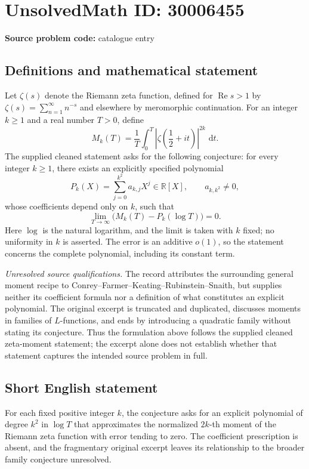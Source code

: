 \documentclass[11pt]{article}
\newcommand{\R}{\mathbb{R}}
\newcommand{\dd}{\,\mathrm{d}}
\begin{document}
\section*{UnsolvedMath ID: 30006455}
\textbf{Source problem code:} catalogue entry
\subsection{Definitions and mathematical statement}
Let \(\zeta(s)\) denote the Riemann zeta function, defined for \(\operatorname{Re}s>1\) by \(\zeta(s)=\sum_{n=1}^{\infty}n^{-s}\) and elsewhere by meromorphic continuation. For an integer \(k\geq1\) and a real number \(T>0\), define
\[
M_k(T)=\frac{1}{T}\int_0^T\left|\zeta\!\left(\frac12+it\right)\right|^{2k}\,\dd t.
\]
The supplied cleaned statement asks for the following conjecture: for every integer \(k\geq1\), there exists an explicitly specified polynomial
\[
P_k(X)=\sum_{j=0}^{k^2}a_{k,j}X^j\in\R[X],\qquad a_{k,k^2}\ne0,
\]
whose coefficients depend only on \(k\), such that
\[
\lim_{T\to\infty}\bigl(M_k(T)-P_k(\log T)\bigr)=0.
\]
Here \(\log\) is the natural logarithm, and the limit is taken with \(k\) fixed; no uniformity in \(k\) is asserted. The error is an additive \(o(1)\), so the statement concerns the complete polynomial, including its constant term.

\emph{Unresolved source qualifications.} The record attributes the surrounding general moment recipe to Conrey--Farmer--Keating--Rubinstein--Snaith, but supplies neither its coefficient formula nor a definition of what constitutes an explicit polynomial. The original excerpt is truncated and duplicated, discusses moments in families of \(L\)-functions, and ends by introducing a quadratic family without stating its conjecture. Thus the formulation above follows the supplied cleaned zeta-moment statement; the excerpt alone does not establish whether that statement captures the intended source problem in full.
\subsection{Short English statement}
For each fixed positive integer \(k\), the conjecture asks for an explicit polynomial of degree \(k^2\) in \(\log T\) that approximates the normalized \(2k\)-th moment of the Riemann zeta function with error tending to zero. The coefficient prescription is absent, and the fragmentary original excerpt leaves its relationship to the broader family conjecture unresolved.
\end{document}
